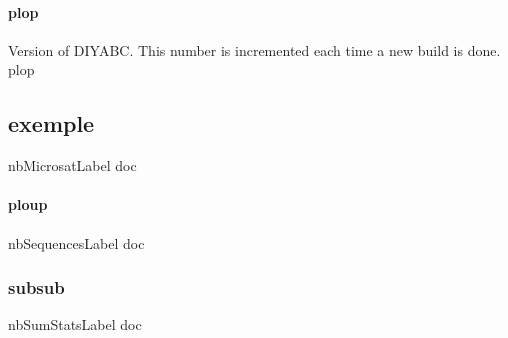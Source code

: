\documentclass[12pt,a4paper]{article}
\begin{document}
        \paragraph{plop}
        \label{doc_versionLabel}
        Version of DIYABC. This number is incremented each time a new build is done.
        plop

        \subsection{exemple}
        \label{doc_nbMicrosatLabel}
        nbMicrosatLabel doc
            \paragraph{ploup}
            \label{doc_nbSequencesLabel}
            nbSequencesLabel doc

            \subsubsection{subsub}
            \label{doc_nbSumStatsLabel}
            nbSumStatsLabel doc
\end{document}
